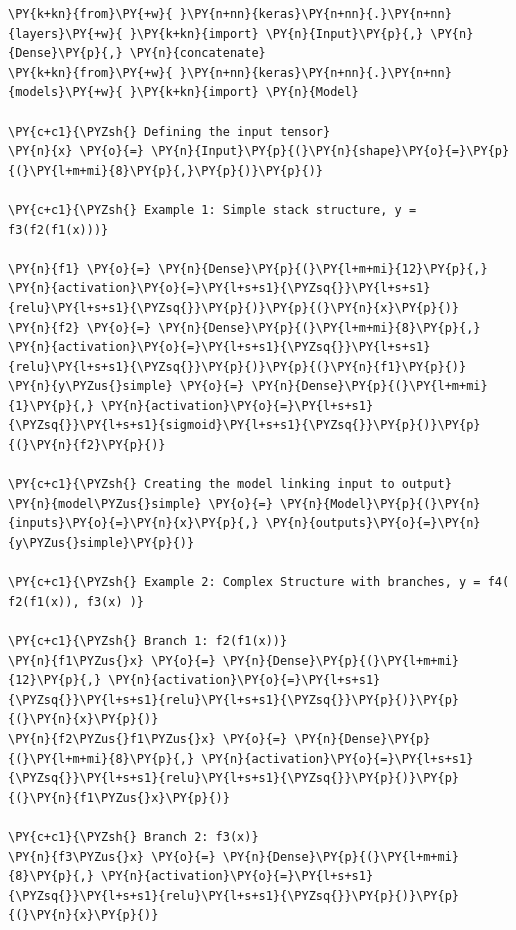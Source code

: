 \begin{Verbatim}[label=\makebox{\url{https://github.com/lucabaldini/cmepda/tree/master/slides/latex/snippets/functional_api_example.py}},commandchars=\\\{\}]
\PY{k+kn}{from}\PY{+w}{ }\PY{n+nn}{keras}\PY{n+nn}{.}\PY{n+nn}{layers}\PY{+w}{ }\PY{k+kn}{import} \PY{n}{Input}\PY{p}{,} \PY{n}{Dense}\PY{p}{,} \PY{n}{concatenate}
\PY{k+kn}{from}\PY{+w}{ }\PY{n+nn}{keras}\PY{n+nn}{.}\PY{n+nn}{models}\PY{+w}{ }\PY{k+kn}{import} \PY{n}{Model}

\PY{c+c1}{\PYZsh{} Defining the input tensor}
\PY{n}{x} \PY{o}{=} \PY{n}{Input}\PY{p}{(}\PY{n}{shape}\PY{o}{=}\PY{p}{(}\PY{l+m+mi}{8}\PY{p}{,}\PY{p}{)}\PY{p}{)}

\PY{c+c1}{\PYZsh{} Example 1: Simple stack structure, y = f3(f2(f1(x)))}

\PY{n}{f1} \PY{o}{=} \PY{n}{Dense}\PY{p}{(}\PY{l+m+mi}{12}\PY{p}{,} \PY{n}{activation}\PY{o}{=}\PY{l+s+s1}{\PYZsq{}}\PY{l+s+s1}{relu}\PY{l+s+s1}{\PYZsq{}}\PY{p}{)}\PY{p}{(}\PY{n}{x}\PY{p}{)}
\PY{n}{f2} \PY{o}{=} \PY{n}{Dense}\PY{p}{(}\PY{l+m+mi}{8}\PY{p}{,} \PY{n}{activation}\PY{o}{=}\PY{l+s+s1}{\PYZsq{}}\PY{l+s+s1}{relu}\PY{l+s+s1}{\PYZsq{}}\PY{p}{)}\PY{p}{(}\PY{n}{f1}\PY{p}{)}
\PY{n}{y\PYZus{}simple} \PY{o}{=} \PY{n}{Dense}\PY{p}{(}\PY{l+m+mi}{1}\PY{p}{,} \PY{n}{activation}\PY{o}{=}\PY{l+s+s1}{\PYZsq{}}\PY{l+s+s1}{sigmoid}\PY{l+s+s1}{\PYZsq{}}\PY{p}{)}\PY{p}{(}\PY{n}{f2}\PY{p}{)}

\PY{c+c1}{\PYZsh{} Creating the model linking input to output}
\PY{n}{model\PYZus{}simple} \PY{o}{=} \PY{n}{Model}\PY{p}{(}\PY{n}{inputs}\PY{o}{=}\PY{n}{x}\PY{p}{,} \PY{n}{outputs}\PY{o}{=}\PY{n}{y\PYZus{}simple}\PY{p}{)}

\PY{c+c1}{\PYZsh{} Example 2: Complex Structure with branches, y = f4( f2(f1(x)), f3(x) )}

\PY{c+c1}{\PYZsh{} Branch 1: f2(f1(x))}
\PY{n}{f1\PYZus{}x} \PY{o}{=} \PY{n}{Dense}\PY{p}{(}\PY{l+m+mi}{12}\PY{p}{,} \PY{n}{activation}\PY{o}{=}\PY{l+s+s1}{\PYZsq{}}\PY{l+s+s1}{relu}\PY{l+s+s1}{\PYZsq{}}\PY{p}{)}\PY{p}{(}\PY{n}{x}\PY{p}{)}
\PY{n}{f2\PYZus{}f1\PYZus{}x} \PY{o}{=} \PY{n}{Dense}\PY{p}{(}\PY{l+m+mi}{8}\PY{p}{,} \PY{n}{activation}\PY{o}{=}\PY{l+s+s1}{\PYZsq{}}\PY{l+s+s1}{relu}\PY{l+s+s1}{\PYZsq{}}\PY{p}{)}\PY{p}{(}\PY{n}{f1\PYZus{}x}\PY{p}{)}

\PY{c+c1}{\PYZsh{} Branch 2: f3(x)}
\PY{n}{f3\PYZus{}x} \PY{o}{=} \PY{n}{Dense}\PY{p}{(}\PY{l+m+mi}{8}\PY{p}{,} \PY{n}{activation}\PY{o}{=}\PY{l+s+s1}{\PYZsq{}}\PY{l+s+s1}{relu}\PY{l+s+s1}{\PYZsq{}}\PY{p}{)}\PY{p}{(}\PY{n}{x}\PY{p}{)}


\end{Verbatim}
